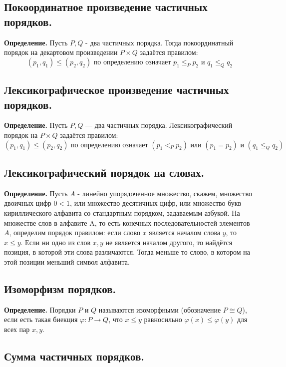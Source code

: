 \documentclass[a4paper, 10pt]{article}
\begin{document}
\subsection{Покоординатное произведение частичных порядков.}

\textbf{Определение.}  Пусть $P, Q$ - два частичных порядка. Тогда покоординатный порядок на декартовом произведении $P \times Q$ задаётся правилом: $$(p_1, q_1) \leqslant (p_2, q_2) \text{ по определению означает } p_1 \leqslant_P p_2 \text{ и } q_1 \leqslant_Q q_2$$

\subsection{Лексикографическое произведение частичных порядков.}

\textbf{Определение.} Пусть $P, Q$ — два частичных порядка. Лексикографический порядок на $P \times Q$ задаётся правилом: $$(p_1, q_1) \leqslant (p_2, q_2) \text{ по определению означает } (p_1 <_P p_2) \text{ или } (p_1 = p_2) \text{ и } (q_1 \leqslant_Q q_2)$$

\subsection{Лексикографический порядок на словах.}

\textbf{Определение.} Пусть $A$ - линейно упорядоченное множество, скажем, множество двоичных цифр $0 < 1$, или множество десятичных цифр, или множество букв кириллического алфавита со стандартным порядком, задаваемым азбукой. На множестве слов в алфавите A, то есть конечных последовательностей элементов $A$, определим порядок правилом: если слово $x$ является началом слова $y$, то $x \leqslant y$. Если ни одно из слов $x, y$ не является началом другого, то найдётся позиция, в которой эти слова различаются. Тогда меньше то слово, в котором на этой позиции меньший символ алфавита.

\subsection{Изоморфизм порядков.}

\textbf{Определение.} Порядки $P$ и $Q$ называются изоморфными (обозначение $P \cong Q$), если есть такая биекция $\varphi: P \to Q$, что $x \leqslant y$ равносильно $\varphi(x) \leqslant \varphi(y)$ для всех пар $x, y$.

\subsection{Сумма частичных порядков.}
\end{document}
